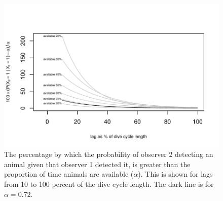 \documentclass[useAMS, usenatbib, referee]{biom}\usepackage[]{graphicx}\usepackage[]{color}
\makeatletter
\def\maxwidth{ %
  \ifdim\Gin@nat@width>\linewidth
    \linewidth
  \else
    \Gin@nat@width
  \fi
}
\newenvironment{knitrout}{}{} %
\makeatother
\begin{document}
\begin{knitrout}
\color{fgcolor}\begin{figure}

{\centering \includegraphics[width=\maxwidth]{figs/fig_p_avail_plot-1} 

}

\caption[The percentage by which the probability of observer 2 detecting an animal given that observer 1 detected it, is greater than the proportion of time animals are available (\(\alpha\))]{The percentage by which the probability of observer 2 detecting an animal given that observer 1 detected it, is greater than the proportion of time animals are available (\(\alpha\)). This is shown for lags from 10 to 100 percent of the dive cycle length. The dark line is for \(\alpha=0.72\).}\label{fig:fig_p_avail_plot}
\end{figure}


\end{knitrout}
\end{document}

